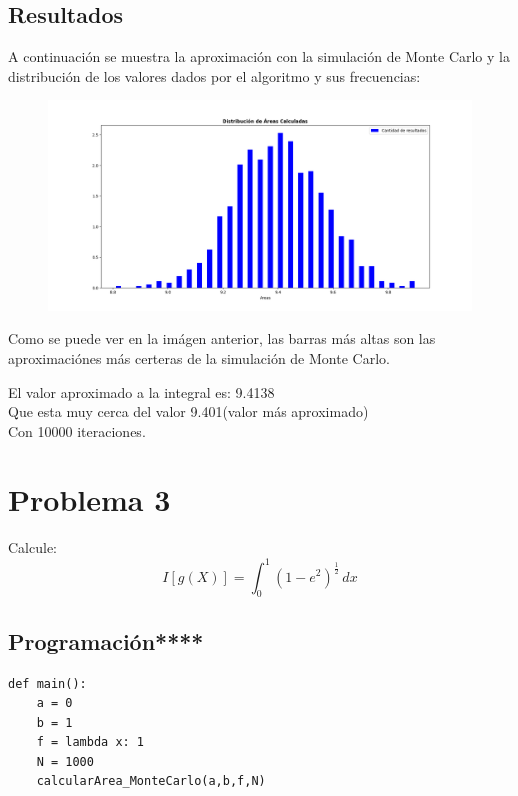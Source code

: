 \documentclass[a4paper,12pt]{article}
\begin{document}
    \subsection{Resultados}
    A continuación se muestra la aproximación con la simulación de Monte Carlo y 
    la distribución de los valores dados por el algoritmo y sus frecuencias:
    \begin{figure}[h]
        \centering
        \includegraphics[width=\textwidth]{ejer2.png}
    \end{figure}

    Como se puede ver en la imágen anterior, las barras más altas son 
    las aproximaciónes más certeras de la simulación de Monte Carlo.

    El valor aproximado a la integral es: 9.4138\\
    Que esta muy cerca del valor 9.401(valor más aproximado)\\
    Con 10000 iteraciones.
    \newpage
    \section{Problema 3}
    Calcule:
    \begin{equation}
        I[g(X)] = \int_{0}^{1} (1 - e^2)^{\frac{1}{2}} \,dx
    \end{equation}
    \subsection{Programación****}
\begin{lstlisting}
def main():
    a = 0
    b = 1
    f = lambda x: 1
    N = 1000
    calcularArea_MonteCarlo(a,b,f,N)
\end{lstlisting}
\end{document}
